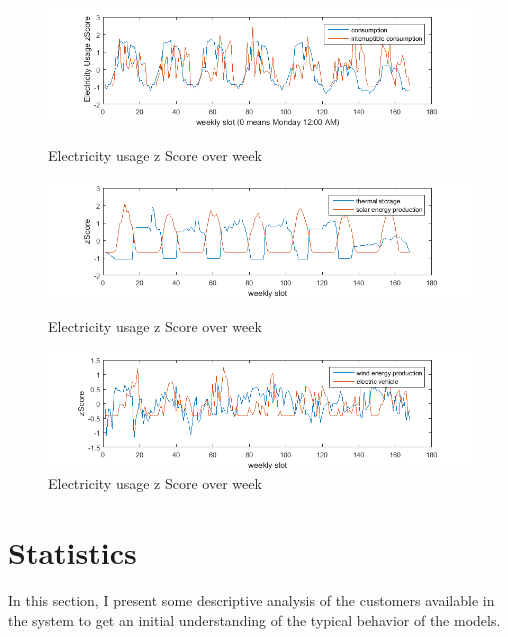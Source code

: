 \begin{figure}
\centering
\includegraphics[scale=0.85]{weekly1.png}
\caption{Electricity usage z Score over week}
\label{fig:weekly1}
\includegraphics[scale=0.85]{weekly2.png}
\caption{Electricity usage z Score over week}
\label{fig:weekly2}
\includegraphics[scale=0.85]{weekly3.png}
\caption{Electricity usage z Score over week}
\label{fig:weekly3}
\end{figure}


\section{Statistics}
In this section, I present some descriptive analysis of the customers available in the system to get an initial understanding of the typical behavior of the models. 

